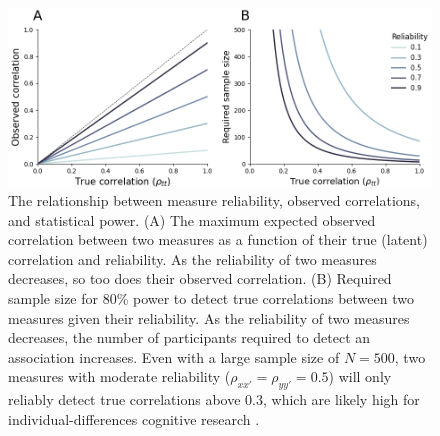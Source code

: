 \documentclass[a4paper,12pt]{article}
\begin{document}
\begin{figure}[tp]
    \centering
    \includegraphics[width=1.0\textwidth]{figures/fig01.png}
    \caption{\small The relationship between measure reliability, observed correlations, and statistical power. (A) The maximum expected observed correlation between two measures as a function of their true (latent) correlation and reliability. As the reliability of two measures decreases, so too does their observed correlation. (B) Required sample size for 80\% power to detect true correlations between two measures given their reliability. As the reliability of two measures decreases, the number of participants required to detect an association increases. Even with a large sample size of $N=500$, two measures with moderate reliability ($\rho_{xx'} = \rho_{yy'} = 0.5$) will only reliably detect true correlations above $0.3$, which are likely high for individual-differences cognitive research \cite{owens2021recalibrating}.}
    \label{fig:fig01}
\end{figure}

\end{document}
